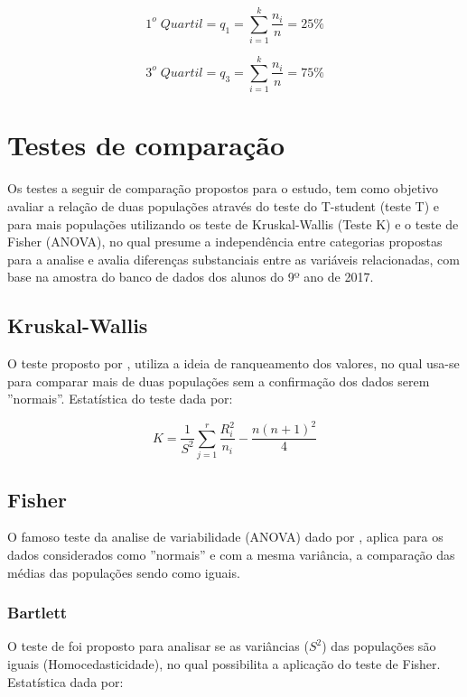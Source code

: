 \begin{equation}
    1^o \; Quartil = q_1 = \sum_{i=1}^{k} \frac{n_i}{n} = 25\%
\end{equation}

\begin{equation}
    3^o \; Quartil = q_3 = \sum_{i=1}^{k} \frac{n_i}{n} = 75\%
\end{equation}



\section{Testes de comparação}

Os testes a seguir de comparação propostos para o estudo, tem como objetivo avaliar a relação de duas populações através do teste do T-student (teste T) e para mais populações utilizando os teste de Kruskal-Wallis (Teste K) e o teste de Fisher (ANOVA), no qual presume a independência entre categorias propostas para a analise e avalia diferenças substanciais entre as variáveis relacionadas, com base na amostra do banco de dados dos alunos do 9º ano de 2017.

\subsection{Kruskal-Wallis} 

O teste proposto por , utiliza a ideia de ranqueamento dos valores, no qual usa-se para comparar mais de duas populações sem a confirmação dos dados serem ''normais''. Estatística do teste dada por:

$$K = \frac{1}{S^2} \sum^r_{j=1} \frac{R^2_i}{n_i} - \frac{n(n+1)^2}{4}$$

\subsection{Fisher}

O famoso teste da analise de variabilidade (ANOVA) dado por , aplica para os dados considerados como ''normais'' e com a mesma variância, a comparação das médias das populações sendo como iguais.

\subsubsection{Bartlett}

O teste de  foi proposto para analisar se as variâncias ($S^2$) das populações são iguais (Homocedasticidade), no qual possibilita a aplicação do teste de Fisher. Estatística dada por:


